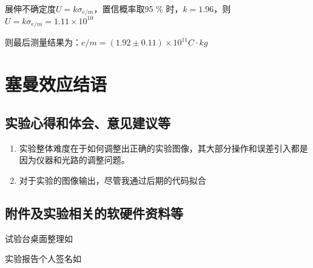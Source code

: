 \documentclass[dvipsnames, svgnames,a4paper,11pt]{article}
\begin{document}
		展伸不确定度$U = k \sigma_{e/m}$，置信概率取95 \% 时，$k = 1.96$，则$U = k \sigma_{e/m} = 1.11 \times 10^{10}		$
		
		则最后测量结果为：$e/m = (1.92 \pm 0.11) \times 10^{11} C \cdot kg$

	\subsubsection{}
	
	

	
	
	\clearpage
	
	\section{塞曼效应\quad\heiti 结语}
	
	\subsection{实验心得和体会、意见建议等}
	\begin{enumerate}
		\item 实验整体难度在于如何调整出正确的实验图像，其大部分操作和误差引入都是因为仪器和光路的调整问题。
		\item 对于实验的图像输出，尽管我通过后期的代码拟合
	\end{enumerate}
	

	\subsection{附件及实验相关的软硬件资料等}
	试验台桌面整理如%
	
	实验报告个人签名如

	
	
\end{document}
